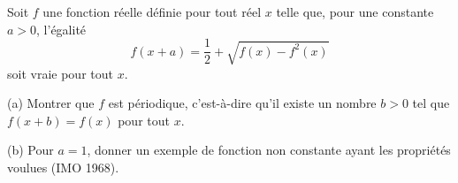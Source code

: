 Soit $f$ une fonction réelle définie pour tout réel $x$ telle que, pour une constante $a > 0$, l'égalité
\[ f(x + a) = \frac{1}{2} + \sqrt{f(x) - f^2(x)} \]
soit vraie pour tout $x$.

(a) Montrer que $f$ est périodique, c'est-à-dire qu'il existe un nombre $b > 0$ tel que $f(x + b) = f(x)$ pour tout $x$.

(b) Pour $a = 1$, donner un exemple de fonction non constante ayant les propriétés voulues (IMO 1968).
